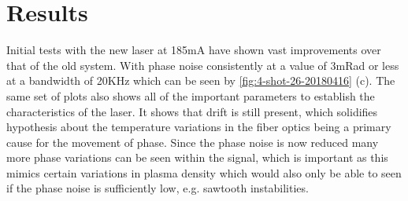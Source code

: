 \documentclass[12pt,a4paper,oneside]{report}
\begin{document}
\section{Results}

Initial tests with the new laser at 185mA have shown vast improvements over that of the old system. With phase noise consistently at a value of 3mRad or less at a bandwidth of 20KHz which can be seen by \autoref{fig:4-shot-26-20180416} (c). The same set of plots also shows all of the important parameters to establish the characteristics of the laser. It shows that drift is still present, which solidifies hypothesis about the temperature variations in the fiber optics being a primary cause for the movement of phase. Since the phase noise is now reduced many more phase variations can be seen within the signal, which is important as this mimics certain variations in plasma density which would also only be able to seen if the phase noise is sufficiently low, e.g. sawtooth instabilities.
\end{document}
